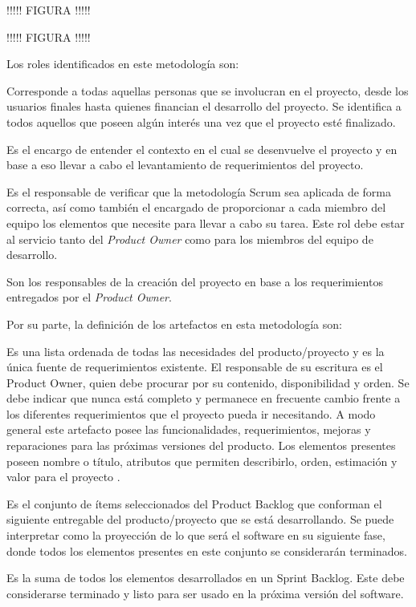 !!!!!  FIGURA !!!!!


!!!!!  FIGURA !!!!!

Los roles identificados en este metodología son:

\begin{description}[leftmargin=10em,style=nextline]
  \item[1. \textit{Stakeholder}] Corresponde a todas aquellas personas que se involucran en el proyecto, desde los usuarios finales hasta quienes financian el desarrollo del proyecto. Se identifica a todos aquellos que poseen algún interés una vez que el proyecto esté finalizado.
  \item[2. \textit{Product Owner}] Es el encargo de entender el contexto en el cual se desenvuelve el proyecto y en base a eso llevar a cabo el levantamiento de requerimientos del proyecto.
  \item[3. \textit{Scrum Master}] Es el responsable de verificar que la metodología Scrum sea aplicada de forma correcta, así como también el encargado de proporcionar a cada miembro del equipo los elementos que necesite para llevar a cabo su tarea. Este rol debe estar al servicio tanto del \textit{Product Owner} como para los miembros del equipo de desarrollo.
  \item[4. \textit{Development Team}] Son los responsables de la creación del proyecto en base a los requerimientos entregados por el \textit{Product Owner}.
\end{description}

Por su parte, la definición de los artefactos en esta metodología son:

\begin{description}[leftmargin=10em,style=nextline]
  \item[1. \textit{Product Backlog}] Es una lista ordenada de todas las necesidades del producto/proyecto y es la única fuente de requerimientos existente. El responsable de su escritura es el Product Owner, quien debe procurar por su contenido, disponibilidad y orden. Se debe indicar que nunca está completo y permanece en frecuente cambio frente a los diferentes requerimientos que el proyecto pueda ir necesitando. A modo general este artefacto posee las funcionalidades, requerimientos, mejoras y reparaciones para las próximas versiones del producto. Los elementos presentes poseen nombre o título, atributos que permiten describirlo, orden, estimación y valor para el proyecto \cite{scrum_guide}.
  \item[2. \textit{Sprint Backlog}] Es el conjunto de ítems seleccionados del Product Backlog que conforman el siguiente entregable del producto/proyecto que se está desarrollando. Se puede interpretar como la proyección de lo que será el software en su siguiente fase, donde todos los elementos presentes en este conjunto se considerarán terminados.
  \item[3. \textit{Increment}] Es la suma de todos los elementos desarrollados en un Sprint Backlog. Este debe considerarse terminado y listo para ser usado en la próxima versión del software.
\end{description}


